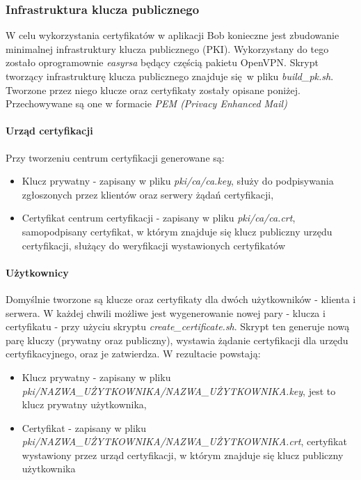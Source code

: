 \documentclass{article}
\begin{document}
    \subsubsection{Infrastruktura klucza publicznego}
      W celu wykorzystania certyfikatów w aplikacji Bob konieczne jest zbudowanie minimalnej infrastruktury klucza
      publicznego (PKI). Wykorzystany do tego zostało oprogramownie \emph{easyrsa} będący częścią pakietu OpenVPN.
      Skrypt tworzący infrastrukturę klucza publicznego znajduje się w pliku \emph{build\_pk.sh}. Tworzone przez
      niego klucze oraz certyfikaty zostały opisane poniżej. Przechowywane są one w formacie \emph{PEM (Privacy Enhanced Mail)}

      \paragraph{Urząd certyfikacji}
        Przy tworzeniu centrum certyfikacji generowane są:
        \begin{itemize}
          \item Klucz prywatny - zapisany w pliku \emph{pki/ca/ca.key}, służy do podpisywania zgłoszonych przez klientów
            oraz serwery żądań certyfikacji,
          \item Certyfikat centrum certyfikacji - zapisany w pliku \emph{pki/ca/ca.crt}, samopodpisany certyfikat, w którym
            znajduje się klucz publiczny urzędu certyfikacji, służący do weryfikacji wystawionych certyfikatów
        \end{itemize}

      \paragraph{Użytkownicy}
        Domyślnie tworzone są klucze oraz certyfikaty dla dwóch użytkowników - klienta i serwera. W każdej chwili możliwe
        jest wygenerowanie nowej pary - klucza i certyfikatu - przy użyciu skryptu \emph{create\_certificate.sh}.
        Skrypt ten generuje nową parę kluczy (prywatny oraz publiczny), wystawia żądanie certyfikacji dla urzędu certyfikacyjnego,
        oraz je zatwierdza. W rezultacie powstają:
        \begin{itemize}
          \item Klucz prywatny - zapisany w pliku \emph{pki/NAZWA\_UŻYTKOWNIKA/NAZWA\_UŻYTKOWNIKA.key}, jest to klucz
            prywatny użytkownika,
          \item Certyfikat - zapisany w pliku \emph{pki/NAZWA\_UŻYTKOWNIKA/NAZWA\_UŻYTKOWNIKA.crt}, certyfikat wystawiony
              przez urząd certyfikacji, w którym znajduje się klucz publiczny użytkownika
        \end{itemize}
\end{document}

